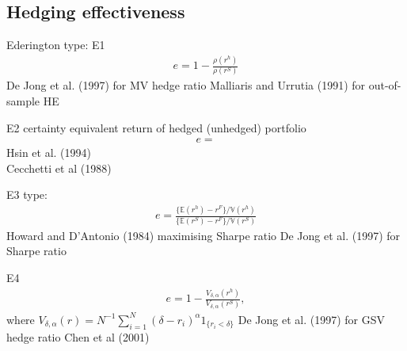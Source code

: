 \subsection{Hedging effectiveness}


Ederington type: E1
\begin{align}
	e = 1 - \frac{\rho(r^h)}{\rho(r^S)}
	\end{align}
De Jong et al. (1997) for MV hedge ratio
Malliaris and Urrutia (1991) for out-of-sample HE


E2 certainty equivalent return of hedged (unhedged) portfolio
\begin{align}
	e =
	\end{align}
Hsin et al. (1994)\\
Cecchetti et al (1988)


E3 type:
\begin{align}
	e = \frac{\{\mathbb{E}(r^h)-r^F\}/\mathbb{V}(r^h)}{\{\mathbb{E}(r^S)-r^F\}/\mathbb{V}(r^S)}
	\end{align}
Howard and D’Antonio (1984) maximising Sharpe ratio
De Jong et al. (1997) for Sharpe ratio

E4
\begin{align}
	e = 1- \frac{V_{\delta, \alpha}(r^h)}{V_{\delta, \alpha}(r^S)},
	\end{align}
where $V_{\delta, \alpha}(r) = N^{-1}\sum_{i=1}^{N}(\delta-r_i)^\alpha 1_{\{ r_i <\delta \}}$
De Jong et al. (1997) for GSV hedge ratio
Chen et al (2001)
